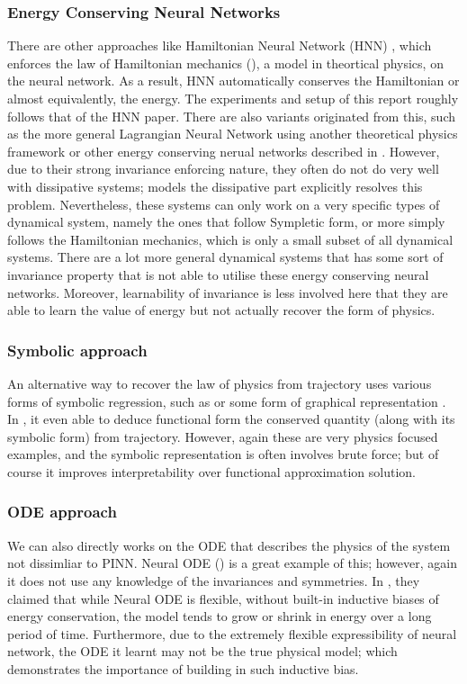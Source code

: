\documentclass{statsmsc}
\begin{document}
\subsubsection{Energy Conserving Neural Networks}
There are other approaches like Hamiltonian Neural Network (HNN) \citep{HNN}, which enforces the law of Hamiltonian mechanics (\cite{lemos_2018}), a model in theortical physics, on the neural network.
As a result, HNN automatically conserves the Hamiltonian or almost equivalently, the energy.
The experiments and setup of this report roughly follows that of the HNN paper.
There are also variants originated from this, such as the more general Lagrangian Neural Network \citep{Cranmer2020} using another theoretical physics framework or other energy conserving nerual networks described in \cite{Zhong2021}.
However, due to their strong invariance enforcing nature, they often do not do very well with dissipative systems; 
\cite{DissipativeHNN} models the dissipative part explicitly resolves this problem.
Nevertheless, these systems can only work on a very specific types of dynamical system, namely the ones that follow Sympletic form, or more simply follows the Hamiltonian mechanics, which is only a small subset of all dynamical systems.
There are a lot more general dynamical systems that has some sort of invariance property that is not able to utilise these energy conserving neural networks.
Moreover, learnability of invariance is less involved here that they are able to learn the value of energy but not actually recover the form of physics. 

\subsubsection{Symbolic approach}
An alternative way to recover the law of physics from trajectory uses various forms of symbolic regression, such as \cite{Udrescu2020, Papastamatiou2022} or some form of graphical representation \cite{GraphSymbolicPhysics, flexiblePhysics}.
In \cite{Liu2021}, it even able to deduce functional form the conserved quantity (along with its symbolic form) from trajectory.
However, again these are very physics focused examples, and the symbolic representation is often involves brute force; but of course it improves interpretability over functional approximation solution.

\subsubsection{ODE approach}
We can also directly works on the ODE that describes the physics of the system not dissimliar to PINN. 
Neural ODE (\cite{NeuralODE}) is a great example of this; 
however, again it does not use any knowledge of the invariances and symmetries.
In \cite{Lim2022}, they claimed that while Neural ODE is flexible, without built-in inductive biases of energy conservation, the model tends to grow or shrink in energy over a long period of time.
Furthermore, due to the extremely flexible expressibility of neural network, the ODE it learnt may not be the true physical model; which demonstrates the importance of building in such inductive bias.  
\end{document}
